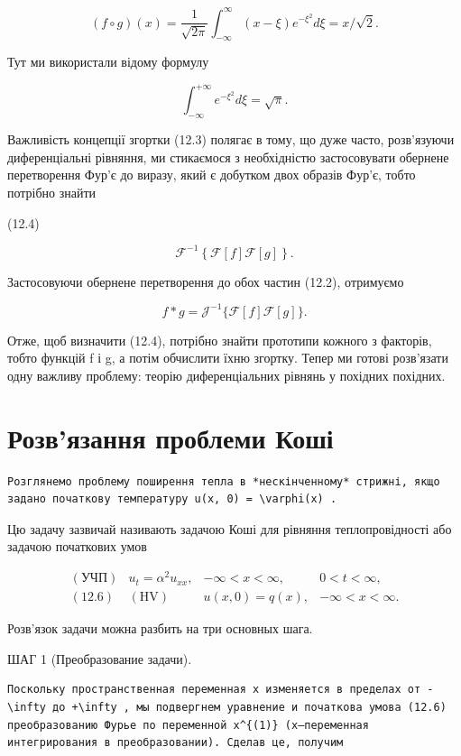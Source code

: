 \documentclass[
  ukrainian,
]{article}
\begin{document}
\[
(f \circ g)(x) = \frac{1}{\sqrt{2\pi}} \int_{-\infty}^{\infty} (x - \xi) e^{-\xi^2} d\xi = x/\sqrt{2}.
\]

Тут ми використали відому формулу

\[
\int_{-\infty}^{+\infty} e^{-\xi^2} d\xi = \sqrt{\pi}.
\]

Важливість концепції згортки (12.3) полягає в тому, що дуже часто,
розв'язуючи диференціальні рівняння, ми стикаємося з необхідністю
застосовувати обернене перетворення Фур'є до виразу, який є добутком
двох образів Фур'є, тобто потрібно знайти

(12.4)

\[
\mathcal{F}^{-1}\left\{\mathcal{F}\left[f\right]\mathcal{F}\left[g\right]\right\}.
\]

Застосовуючи обернене перетворення до обох частин (12.2), отримуємо

\[
f * g = \mathcal{J}^{-1} \{ \mathcal{F} [f] \mathcal{F} [g] \}.
\]

Отже, щоб визначити (12.4), потрібно знайти прототипи кожного з
факторів, тобто функцій f і g, а потім обчислити їхню згортку. Тепер ми
готові розв'язати одну важливу проблему: теорію диференціальних рівнянь
у похідних похідних.

\section{Розв'язання проблеми
Коші}\label{ux440ux43eux437ux432ux44fux437ux430ux43dux43dux44f-ux43fux440ux43eux431ux43bux435ux43cux438-ux43aux43eux448ux456}

\begin{verbatim}
Розглянемо проблему поширення тепла в *нескінченному* стрижні, якщо задано початкову температуру u(x, 0) = \varphi(x) .
\end{verbatim}

Цю задачу зазвичай називають задачою Коші для рівняння теплопровідності
або задачою початкових умов

\[
\begin{aligned} (\text{УЧП}) & u_t = \alpha^2 u_{xx}, & -\infty < x < \infty, & 0 < t < \infty, \\ (\text{12.6}) & (\text{HV}) & u(x,0) = q(x), & -\infty < x < \infty. \end{aligned}
\]

Розв'язок задачи можна разбить на три основных шага.

ШАГ 1 (Преобразование задачи).

\begin{verbatim}
Поскольку пространственная переменная x изменяется в пределах от -\infty до +\infty , мы подвергнем уравнение и початкова умова (12.6) преобразованию Фурье по переменной x^{(1)} (x—переменная интегрирования в преобразовании). Сделав це, получим
\end{verbatim}
\end{document}
